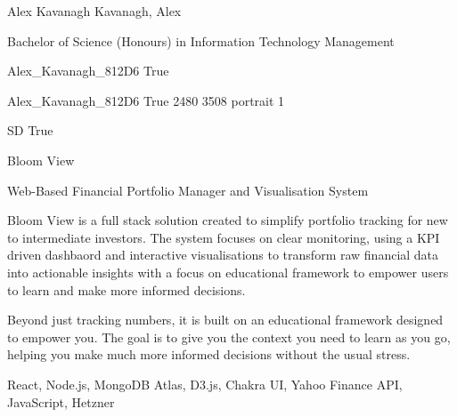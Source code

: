 \documentclass[twoside]{report}
\begin{document}
\begingroup{}\relax



\def\Key{Alex_Kavanagh_812D6}

{Alex Kavanagh}
{Kavanagh, Alex}

{Bachelor of Science (Honours) in Information Technology Management}

{Alex_Kavanagh_812D6}
{True}

{Alex_Kavanagh_812D6}
{True}
{2480}
{3508}
{portrait}
{1}

{SD}
{True}

{Bloom View}

{Web-Based Financial Portfolio Manager and Visualisation System}

{Bloom View is a full stack solution created to simplify portfolio tracking for new to intermediate investors. The system focuses on clear monitoring, using a KPI driven dashbaord and interactive visualisations to transform raw financial data into actionable insights with a focus on educational framework to empower users to learn and make more informed decisions. 

Beyond just tracking numbers, it is built on an educational framework designed to empower you. The goal is to give you the context you need to learn as you go, helping you make much more informed decisions without the usual stress.}

{React, Node.js, MongoDB Atlas, D3.js, Chakra UI, Yahoo Finance API, JavaScript, Hetzner}
\end{document}
